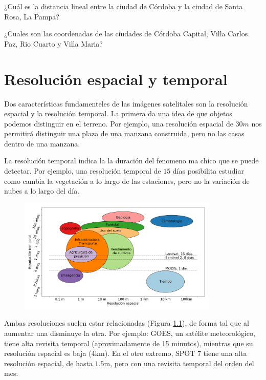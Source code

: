 \documentclass[a4paper,12pt]{book}
\begin{document}
\begin{que}
    ¿Cuál es la distancia lineal entre la ciudad de Córdoba y la ciudad de Santa Rosa, La Pampa?
\end{que}

\begin{que}
    ¿Cuales son las coordenadas de las ciudades de Córdoba Capital, Villa Carlos Paz, Rio Cuarto y Villa Maria?
\end{que}




\chapter{Resolución espacial y temporal}
Dos características fundamenteles de las imágenes satelitales son la resolución espacial y la resolución temporal. La primera da una idea de que objetos podemos distinguir en el terreno. Por ejemplo, una resolución espacial de $30m$ nos permitirá distinguir una plaza de una manzana construida, pero no las casas dentro de una manzana.

La resolución temporal indica la la duración del fenomeno ma chico que se puede detectar. Por ejemplo, una resolución temporal de $15$ días posibilita estudiar como cambia la vegetación a lo largo de las estaciones, pero no la variación de nubes a lo largo del día.

\begin{figure}[h!]
    \centering
    \includegraphics[width=0.85\textwidth]{fig:evst.png}
    \caption{}
    \label{fig:evst}
\end{figure}


Ambas resoluciones suelen estar relacionadas (Figura \ref{fig:evst}), de forma  tal que al aumentar una disminuye la otra. Por ejemplo: GOES, un satélite meteorológico, tiene alta revisita temporal (aproximadamente de 15 minutos), mientras que su resolución espacial es baja (4km). En el otro extremo, SPOT 7 tiene una alta resolución espacial, de hasta $1.5$m, pero con una revisita temporal del orden del mes.
\end{document}
